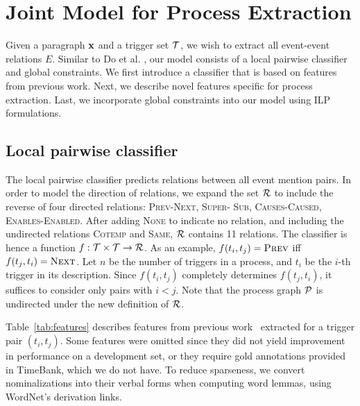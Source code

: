 \section{Joint Model for Process Extraction}

Given a paragraph $\mathbf{x}$ and a trigger set $\mathcal{T}$, we wish to extract all event-event relations $E$. Similar to Do et al. , our model consists of a local pairwise classifier and global constraints. We first introduce a classifier that is based on features from previous work. Next, we describe novel features specific for process extraction. Last, we incorporate global constraints into our model using ILP formulations.

\subsection{Local pairwise classifier} \label{subsec:pairwise}

The local pairwise classifier predicts relations between all event mention pairs. In order to model the direction of relations, we expand the set $\mathcal{R}$ to include the reverse of four directed relations: \textsc{Prev}-\textsc{Next},  \textsc{Super}- \textsc{Sub}, \textsc{Causes}-\textsc{Caused}, \textsc{Enables}-\textsc{Enabled}. After adding \textsc{None} to indicate no relation, and including the undirected relations \textsc{Cotemp} and \textsc{Same}, $\mathcal{R}$ contains 11 relations. The classifier is hence a function $f:\mathcal{T} \times \mathcal{T} \rightarrow \mathcal{R}$. As an example, $f(t_i,t_j)=\mbox{\textsc{Prev}}$ iff $f(t_j,t_i)=\mbox{\textsc{Next}}$. Let $n$ be the number of triggers in a process, and $t_i$ be the $i$-th trigger in its description. Since $f(t_i,t_j)$ completely determines $f(t_j,t_i)$, it suffices to consider only pairs with $i<j$. Note that the process graph $\mathcal{P}$ is undirected under the new definition of $\mathcal{R}$.

Table~\ref{tab:features} describes features from previous work~\cite{Chambers08,Do12} extracted for a trigger pair $(t_i,t_j)$. Some features were omitted since they did not yield improvement in performance on a development set, or they require gold annotations provided in TimeBank, which we do not have. To reduce sparseness, we convert nominalizations into their verbal forms when computing word lemmas, using WordNet's \cite{Fellbaum1998} derivation links.

